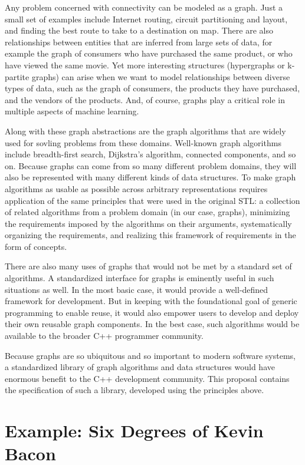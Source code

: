 Any problem concerned with connectivity can be modeled as a graph.  
Just a small set of examples include
Internet routing, circuit partitioning and layout, and finding the best route to take to a destination on map.
There are also relationships between entities that are inferred from large sets of data, for example the graph of consumers who have purchased the same product, or who have viewed the same movie.
Yet more interesting structures (hypergraphs or k-partite graphs) can arise when we want to model relationships between diverse types of data, such as the graph of consumers, the products they have purchased, and the vendors of the products.
And, of course, graphs play a critical role in multiple aspects of machine learning.

Along with these graph abstractions are the graph algorithms that are widely used for sovling problems from these domains.
Well-known graph algorithms include breadth-first search, Dijkstra's algorithm, connected components, and so on.
%
Because graphs can come from so many different problem domains, they will also be represented with many different kinds of data structures.
To make graph algorithms as usable as possible across arbitrary representations requires application of the same principles that were used in the original STL: 
a collection of related algorithms from a problem domain (in our case, graphs),
minimizing the requirements imposed by the algorithms on their arguments,
systematically organizing the requirements, and
realizing this framework of requirements in the form of concepts.

There are also many uses of graphs that would not be met by a standard set of algorithms.  A standardized interface for graphs is eminently useful in such situations as well.  
In the most basic case, it would provide a well-defined framework for development.  But in keeping with the foundational goal of generic programming to enable reuse, it would also empower users to develop and deploy their own reusable graph components.  In the best case, such algorithms would be available to the broader C++ programmer community.

Because graphs are so ubiquitous and so important to modern software systems, a standardized library of graph algorithms and data structures would have enormous benefit to the C++ development community.
This proposal contains the specification of such a library, developed using the principles above.



\section{Example: Six Degrees of Kevin Bacon}
\label{sec:bacon}


